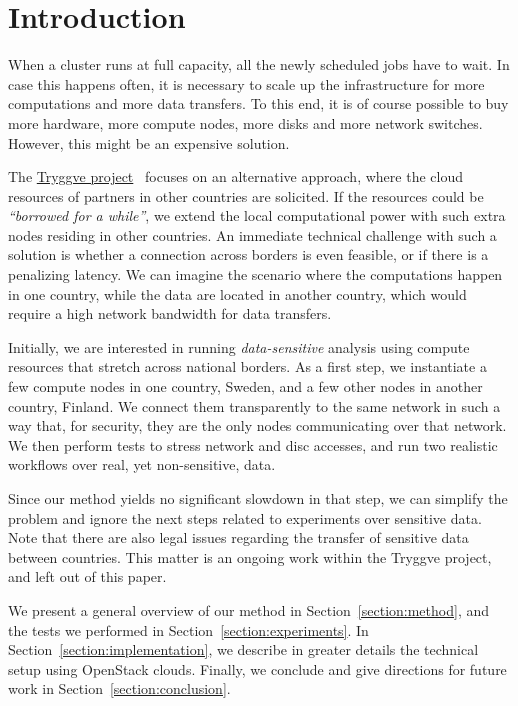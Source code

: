 \section{Introduction}
\label{section:intro}

When a cluster runs at full capacity, all the newly scheduled jobs
have to wait. In case this happens often, it is necessary to scale up
the infrastructure for more computations and more data transfers. To
this end, it is of course possible to buy more hardware, \ie more
compute nodes, more disks and more network switches. However, this
might be an expensive solution.

The \href{https://wiki.neic.no/wiki/Tryggve}{Tryggve
  project}~\cite{tryggve} focuses %
on an alternative approach, where the cloud resources of partners in
other countries are solicited.
%
If the resources could be \emph{``borrowed for a while''}, we extend
the local computational power with such extra nodes residing in other
countries.
%
An immediate technical challenge with such a solution is whether a
connection across borders is even feasible, or if there is a
penalizing latency. We can imagine the scenario where the computations
happen in one country, while the data are located in another country,
which would require a high network bandwidth for data transfers.

Initially, we are interested in running \emph{data-sensitive} analysis
using compute resources that stretch across national borders.
%
As a first step, we instantiate a few compute nodes in one country,
Sweden, and a few other nodes in another country, Finland. We connect
them transparently to the same network in such a way that, for
security, they are the only nodes communicating over that network. We
then perform tests to stress network and disc accesses, and run two
realistic workflows over real, yet non-sensitive, data.

Since our method yields no significant slowdown in that step, we
can simplify the problem and ignore the next steps related to
experiments over sensitive data.
%
Note that there are also legal issues regarding the transfer of
sensitive data between countries. This matter is an ongoing work
within the Tryggve project, and left out of this paper.

We present a general overview of our method in
Section~\ref{section:method}, and the tests we performed in
Section~\ref{section:experiments}.
%
In Section~\ref{section:implementation}, we describe in greater
details the technical setup using OpenStack clouds.
%
Finally, we conclude and give directions for future work in
Section~\ref{section:conclusion}.
